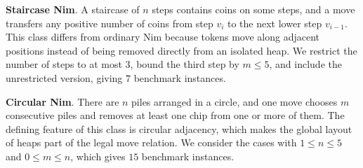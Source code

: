 \documentclass[review]{elsarticle}
\newcommand{\set}[1]{\{ #1 \}}
\newcommand{\tuple}[1]{\langle {#1} \rangle}
\newcommand{\true}{\top}
\newcommand{\statevar}{\mathcal{X}}
\newcommand{\act}{\mathcal{A}}
\newcommand{\constraint}{\mathcal{C}}
\newcommand{\estate}{\mathcal{E}}
\newcommand{\pre}{\mathtt{pre}}
\newcommand{\eff}{\mathtt{eff}}
\begin{document}
{\color{red}\textbf{Staircase Nim}. A staircase of $n$ steps contains coins on some steps, and a move transfers any positive number of coins from step $v_i$ to the next lower step $v_{i-1}$.}
{\color{red}This class differs from ordinary Nim because tokens move along adjacent positions instead of being removed directly from an isolated heap.}
{\color{red}We restrict the number of steps to at most $3$, bound the third step by $m \le 5$, and include the unrestricted version, giving $7$ benchmark instances.}

{\color{red}\textbf{Circular Nim}. There are $n$ piles arranged in a circle, and one move chooses $m$ consecutive piles and removes at least one chip from one or more of them.}
{\color{red}The defining feature of this class is circular adjacency, which makes the global layout of heaps part of the legal move relation.}
{\color{red}We consider the cases with $1 \le n \le 5$ and $0 \le m \le n$, which gives $15$ benchmark instances.}
\end{document}
